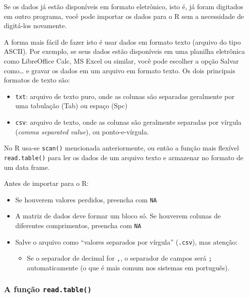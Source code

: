 \documentclass[
  10pt,
  a4paper]{book}
\providecommand{\tightlist}{%
  \setlength{\itemsep}{0pt}\setlength{\parskip}{0pt}}
\begin{document}
Se os dados já estão disponíveis em formato eletrônico, isto é, já foram
digitados em outro programa, você pode importar os dados para o R sem a
necessidade de digitá-los novamente.

A forma mais fácil de fazer isto é usar dados em formato texto (arquivo
do tipo ASCII). Por exemplo, se seus dados estão disponíveis em uma
planilha eletrônica como LibreOffice Calc, MS Excel ou similar, você
pode escolher a opção Salvar como\ldots{} e gravar os dados em um
arquivo em formato texto. Os dois principais formatos de texto são:

\begin{itemize}
\tightlist
\item
  \texttt{txt}: arquivo de texto puro, onde as colunas são separadas geralmente
  por uma tabulação (Tab) ou espaço (Spc)
\item
  \texttt{csv}: arquivo de texto, onde as colunas são geralmente separadas por
  vírgula (\emph{comma separated value}), ou ponto-e-vírgula.
\end{itemize}

No R usa-se \texttt{scan()} mencionada anteriormente, ou então a função mais
flexível \texttt{read.table()} para ler os dados de um arquivo texto e
armazenar no formato de um data frame.

Antes de importar para o R:

\begin{itemize}
\tightlist
\item
  Se houverem valores perdidos, preencha com \texttt{NA}
\item
  A matriz de dados deve formar um bloco só. Se houverem colunas de
  diferentes comprimentos, preencha com \texttt{NA}
\item
  Salve o arquivo como ``valores separados por vírgula'' (\texttt{.csv}), mas
  atenção:

  \begin{itemize}
  \tightlist
  \item
    Se o separador de decimal for \texttt{,}, o separador de campos será
    \texttt{;} automaticamente (o que é mais comum nos sistemas
    em português).
  \end{itemize}
\end{itemize}

\hypertarget{a-funuxe7uxe3o-read.table}{%
\subsubsection{\texorpdfstring{A função \texttt{read.table()}}{A função read.table()}}\label{a-funuxe7uxe3o-read.table}}
\end{document}

